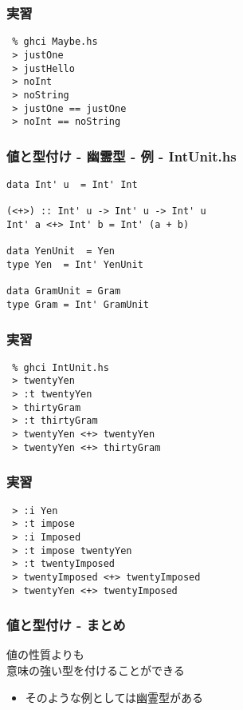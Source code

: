 \documentclass[cjk,dvipdfm,14pt]{beamer}
\begin{document}
\begin{frame}[fragile]
\frametitle{実習}

\begin{lstlisting}
 % ghci Maybe.hs
 > justOne
 > justHello
 > noInt
 > noString
 > justOne == justOne
 > noInt == noString
\end{lstlisting}

\end{frame}

\begin{frame}[fragile]
\frametitle{値と型付け - 幽霊型 - 例 - IntUnit.hs}

\begin{lstlisting}
data Int' u  = Int' Int

(<+>) :: Int' u -> Int' u -> Int' u
Int' a <+> Int' b = Int' (a + b)

data YenUnit  = Yen
type Yen  = Int' YenUnit

data GramUnit = Gram
type Gram = Int' GramUnit
\end{lstlisting}

\end{frame}

\begin{frame}[fragile]
\frametitle{実習}

\begin{lstlisting}
 % ghci IntUnit.hs
 > twentyYen
 > :t twentyYen
 > thirtyGram
 > :t thirtyGram
 > twentyYen <+> twentyYen
 > twentyYen <+> thirtyGram
\end{lstlisting}

\end{frame}

\begin{frame}[fragile]
\frametitle{実習}

\begin{lstlisting}
 > :i Yen
 > :t impose
 > :i Imposed
 > :t impose twentyYen
 > :t twentyImposed
 > twentyImposed <+> twentyImposed
 > twentyYen <+> twentyImposed
\end{lstlisting}

\end{frame}

\begin{frame}[fragile]
\frametitle{値と型付け - まとめ}

値の性質よりも\\
意味の強い型を付けることができる
\begin{itemize}
\item そのような例としては幽霊型がある
\end{itemize}

\end{frame}
\end{document}
